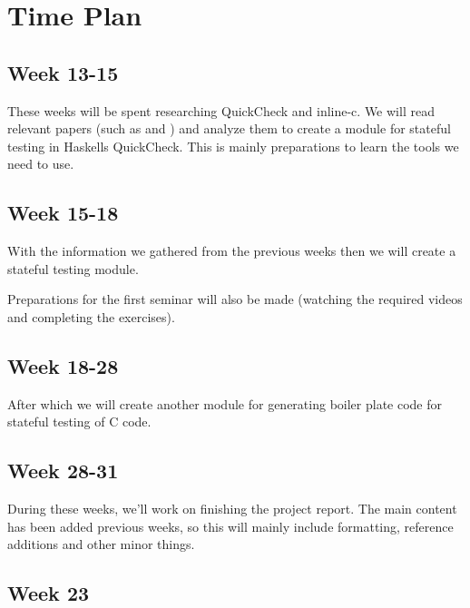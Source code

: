 \section{Time Plan}


\subsection{Week 13-15}

These weeks will be spent researching QuickCheck and inline-c.
We will read relevant papers (such as \citep{QuickCheck} and \citep{QuickCheckQuviq}) and analyze them to create a module for stateful testing in Haskells QuickCheck.
This is mainly preparations to learn the tools we need to use.

\subsection{Week 15-18}

With the information we gathered from the previous weeks then we will create a stateful testing module.

Preparations for the first seminar will also be made (watching the required videos and completing the exercises).

\subsection{Week 18-28}

After which we will create another module for generating boiler plate code for stateful testing of C code.

\subsection{Week 28-31}

During these weeks, we'll work on finishing the project report. The main content has been added previous weeks, so this will mainly include formatting, reference additions and other minor things.

\subsection{Week 23}

